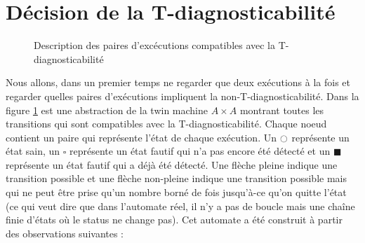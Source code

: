 \documentclass[conference]{IEEEtran}
\newcommand{\es}{\square}
\newcommand{\fs}{\blacksquare}
\newcommand{\ec}{\ocircle}
\begin{document}
\section{Décision de la T-diagnosticabilité}
\begin{figure}
\caption{Description des paires d'excécutions compatibles avec la T-diagnosticabilité}
\label{a2diag}
\end{figure}
Nous allons, dans un premier temps ne regarder que deux exécutions à la fois et regarder quelles paires d'exécutions impliquent la non-T-diagnosticabilité. Dans la figure \ref{a2diag} est une abstraction de la twin machine $A\times A$ montrant toutes les transitions qui sont compatibles avec la T-diagnosticabilité. Chaque noeud contient un paire qui représente l'état de chaque exécution. Un $\ec$ représente un état sain, un $\es$ représente un état fautif qui n'a pas encore été détecté et un $\fs$ représente un état fautif qui a déjà été détecté. Une flèche pleine indique une transition possible et une flèche non-pleine indique une transition possible mais qui ne peut être prise qu'un nombre borné de fois jusqu'à-ce qu'on quitte l'état (ce qui veut dire que dans l'automate réel, il n'y a pas de boucle mais une chaîne finie d'états où le status ne change pas). Cet automate a été construit \`a partir des observations suivantes :
\end{document}
